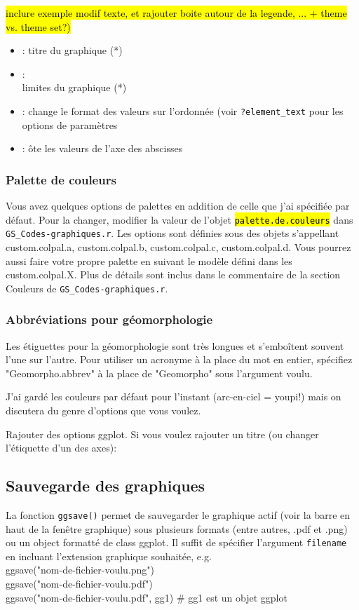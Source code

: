 \documentclass[12pt]{article}
\newcommand{\codegraph}{\texttt{GS\_Codes-graphiques.r}}
\begin{document}
\hl{inclure exemple modif texte, et rajouter boite autour de la legende, ... + theme vs. theme set?)}
\begin{itemize}
\item[] \texttt{}: titre du graphique  (*)
\item[] \texttt{}:\\ limites du graphique  (*)
\item[] \texttt{}: change le format des valeurs sur l'ordonnée (voir \texttt{?element\_text} pour les options de paramètres
\item[] \texttt{}: ôte les valeurs de l'axe des abscisses 
\end{itemize}

\subsubsection{Palette de couleurs}
Vous avez quelques options de palettes en addition de celle que j'ai spécifiée par défaut. Pour la changer, modifier la valeur de l'objet \hl{\texttt{palette.de.couleurs}} dans \codegraph. Les options sont définies sous des objets s'appellant custom.colpal.a, custom.colpal.b, custom.colpal.c, custom.colpal.d. Vous pourrez aussi faire votre propre palette en suivant le modèle défini dans les custom.colpal.X. Plus de détails sont inclus dans le commentaire de la section Couleurs de \codegraph.

\subsubsection{Abbréviations pour géomorphologie} Les étiguettes pour la géomorphologie sont très longues et s'emboîtent souvent l'une sur l'autre. Pour utiliser un acronyme à la place du mot en entier, spécifiez "Geomorpho.abbrev" à la place de "Geomorpho" sous l'argument voulu.


J’ai gardé les couleurs par défaut pour l’instant (arc-en-ciel =  youpi!) mais on discutera du genre d’options que vous voulez.

Rajouter des options ggplot. Si vous voulez rajouter un titre (ou changer l’étiquette d’un des axes):\\


\subsection{Sauvegarde des graphiques}
La fonction \texttt{ggsave()} permet de sauvegarder le graphique actif (voir la barre en haut de la fenêtre graphique) sous plusieurs formats (entre autres, .pdf et .png) ou un object formatté de class ggplot. Il suffit de spécifier l'argument \texttt{filename} en incluant l'extension graphique souhaitée, e.g.\\
ggsave("nom-de-fichier-voulu.png")\\
ggsave("nom-de-fichier-voulu.pdf")\\
ggsave("nom-de-fichier-voulu.pdf", gg1) \# gg1 est un objet ggplot
\end{document}
